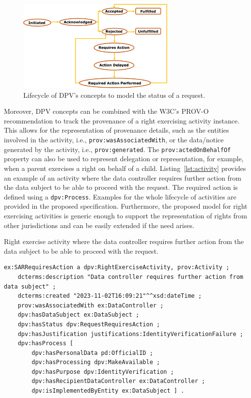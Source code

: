 \documentclass{IOS-Book-Article}     %
\begin{document}
\begin{figure}[ht]
\caption{Lifecycle of DPV's concepts to model the status of a request.}
\label{fig:status}
\centering
\includegraphics[width=0.7\textwidth]{img/request-status.png}
\end{figure}

Moreover, DPV concepts can be combined with the W3C's PROV-O recommendation to track the provenance of a right exercising activity instance.
This allows for the representation of provenance details, such as the entities involved in the activity, i.e., \texttt{prov:wasAssociatedWith}, or the data/notice generated by the activity, i.e., \texttt{prov:generated}. The \texttt{prov:actedOnBehalfOf} property can also be used to represent delegation or representation, for example, when a parent exercises a right on behalf of a child.
Listing~\ref{lst:activity} provides an example of an activity where the data controller requires further action from the data subject to be able to proceed with the request. The required action is defined using a \texttt{dpv:Process}.
Examples for the whole lifecycle of activities are provided in the proposed specification.
Furthermore, the proposed model for right exercising activities is generic enough to support the representation of rights from other jurisdictions and can be easily extended if the need arises.

\begin{listing}[ht]
\caption{Right exercise activity where the data controller requires further action from the data subject to be able to proceed with the request.}
\label{lst:activity}
\begin{verbatim}
ex:SARRequiresAction a dpv:RightExerciseActivity, prov:Activity ;
    dcterms:description "Data controller requires further action from data subject" ;
    dcterms:created "2023-11-02T16:09:21"^^xsd:dateTime ;
    prov:wasAssociatedWith ex:DataController ;
    dpv:hasDataSubject ex:DataSubject ;
    dpv:hasStatus dpv:RequestRequiresAction ;
    dpv:hasJustification justifications:IdentityVerificationFailure ;
    dpv:hasProcess [
        dpv:hasPersonalData pd:OfficialID ;
        dpv:hasProcessing dpv:MakeAvailable ;
        dpv:hasPurpose dpv:IdentityVerification ;
        dpv:hasRecipientDataController ex:DataController ;
        dpv:isImplementedByEntity ex:DataSubject ] .
\end{verbatim}
\end{listing}
\end{document}
